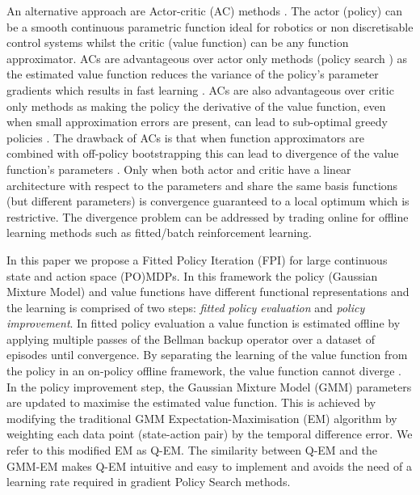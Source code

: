 \documentclass[final,5p,times,twocolumn]{elsarticle}
\begin{document}
An alternative approach are Actor-critic (AC) methods \cite[Chap. 6.6]{sutton1998reinforcement}. 
The actor (policy) can be a smooth continuous parametric function ideal for robotics or non discretisable control systems
whilst the critic (value function) can be any function approximator. ACs are advantageous over actor only methods 
(policy search \cite{p_search_surv_2011}) as the estimated value function reduces the variance of the policy's 
parameter gradients which results in fast learning \cite{rl_ac_surv_2012}. 
ACs are also advantageous over critic only methods as making the policy the derivative of 
the value function, even when small approximation errors are present, can lead to sub-optimal 
greedy policies \cite{Baxter_GPOMDP_2000}. The drawback of ACs is that 
when function approximators are combined with off-policy bootstrapping \cite[Chap. 8.5]{sutton1998reinforcement} this can lead 
to divergence of the value function's parameters \cite{Baird95}. Only when both actor and critic
have a linear architecture with respect to the parameters and share the same basis functions 
(but different parameters) is convergence guaranteed to a local optimum \cite{Sutton00policygradient} 
which is restrictive. The divergence problem can be addressed by trading online for 
offline learning methods such as fitted/batch reinforcement learning.


In this paper we propose a Fitted Policy Iteration (FPI) for large continuous state and action space 
(PO)MDPs. In this framework the policy (Gaussian Mixture Model) and value functions have different 
functional representations and the learning is comprised of two steps: \textit{fitted policy evaluation} and \textit{policy improvement}. 
In fitted policy evaluation a value function is estimated offline by applying multiple passes of 
the Bellman backup operator over a dataset of episodes until convergence. 
By separating the learning of the value function from the policy in an on-policy offline framework, 
the value function cannot diverge \cite{stable_FA_gordon_1995,LSPI_2003}. 
In the policy improvement step,  the Gaussian Mixture Model (GMM) parameters are updated 
to maximise the estimated value function. This is achieved by modifying the traditional GMM 
Expectation-Maximisation (EM) algorithm \cite{Bilmes97agentle}
by weighting each data point (state-action pair) by the temporal difference error. 
We refer to this modified EM as Q-EM. The similarity between Q-EM and the GMM-EM makes Q-EM 
intuitive and easy to implement and avoids the need of a learning rate required in gradient 
Policy Search methods.
\end{document}
